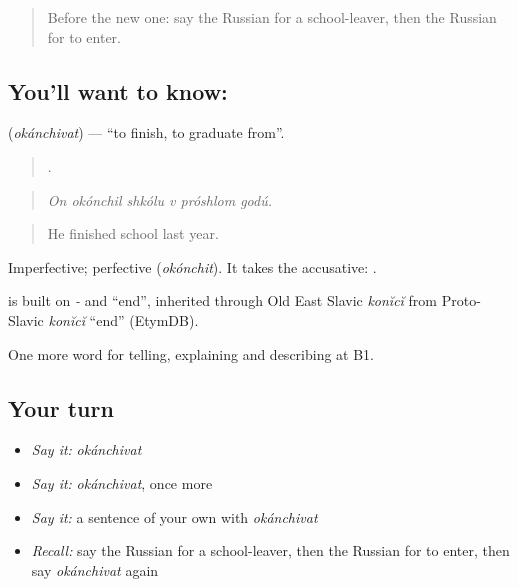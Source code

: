 \label{lesson:RU-C308-okanchivat}



\begin{quote}
Before the new one: say the Russian for a school-leaver, then the Russian for to enter.
\end{quote}

\subsection*{You'll want to know: }
\textbf{} (\emph{okánchivat}) — \textquotedblleft{}to finish, to graduate from\textquotedblright{}.

\begin{quote}
     .
\end{quote}

\begin{quote}
\emph{On okónchil shkólu v próshlom godú.}
\end{quote}

\begin{quote}
He finished school last year.
\end{quote}

Imperfective; perfective \emph{} (\emph{okónchit}). It takes the accusative: \emph{ }.

\begin{cousinweb}
\emph{} is built on \emph{-} and \emph{} \textquotedblleft{}end\textquotedblright{}, inherited through Old East Slavic \emph{konĭcĭ} from Proto-Slavic \emph{konĭcĭ} \textquotedblleft{}end\textquotedblright{} (EtymDB).
\end{cousinweb}

\begin{grammarlens}[title={What you've built}]
One more word for telling, explaining and describing at B1.
\end{grammarlens}

\subsection*{Your turn}
\begin{itemize}
\raggedright
  \item \emph{Say it:} \emph{okánchivat}
  \item \emph{Say it:} \emph{okánchivat}, once more
  \item \emph{Say it:} a sentence of your own with \emph{okánchivat}
  \item \emph{Recall:} say the Russian for a school-leaver, then the Russian for to enter, then say \emph{okánchivat} again
\end{itemize}

